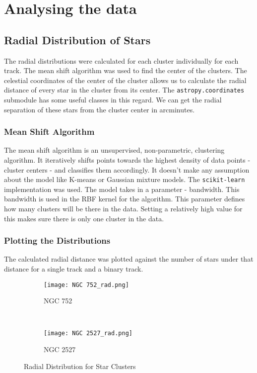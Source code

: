 \chapter{Analysing the data}\label{ch:ch3}

\section{Radial Distribution of Stars}
The radial distributions were calculated for each cluster individually for each track. The mean shift algorithm was used to find the center of the clusters. The celestial coordinates of the center of the cluster allows us to calculate the radial distance of every star in the cluster from its center. The \lstinline{astropy.coordinates} {}submodule has some useful classes in this regard. We can get the radial separation of these stars from the cluster center in arcminutes.

\subsection{Mean Shift Algorithm}
The mean shift algorithm is an unsupervised, non-parametric, clustering algorithm. It iteratively shifts points towards the highest density of data points - cluster centers - and classifies them accordingly. It doesn't make any assumption about the model like K-means or Gaussian mixture models. The \lstinline{scikit-learn}\citep{scikit-learn} implementation was used. The model takes in a parameter - bandwidth. This bandwidth is used in the RBF kernel for the algorithm. This parameter defines how many clusters will be there in the data. Setting a relatively high value for this makes sure there is only one cluster in the data. 

\subsection{Plotting the Distributions}
The calculated radial distance was plotted against the number of stars under that distance for a single track and a binary track. 

\begin{figure}[H]
\centering
\begin{subfigure}[b]{0.4\textwidth}
  \centering
  \texttt{[image: NGC 752\_rad.png]}
  \caption{NGC 752}
  \label{fig:im4}
 \end{subfigure}
~
\begin{subfigure}[b]{0.4\textwidth}
  \centering
  \texttt{[image: NGC 2527\_rad.png]}
  \caption{NGC 2527}
  \label{fig:im5}
\end{subfigure}
\caption{Radial Distribution for Star Clusters}
\label{fig:sim1}
\end{figure}

